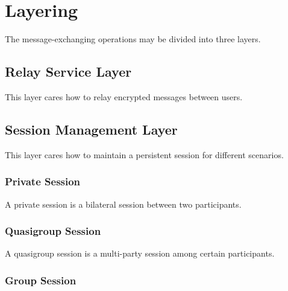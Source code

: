 \documentclass[a4paper,11pt]{article}
\begin{document}
\section{Layering}

The message-exchanging operations may be divided into three layers.


\subsection{Relay Service Layer}

This layer cares how to relay encrypted messages between users.


\subsection{Session Management Layer}

This layer cares how to maintain a persistent session for different scenarios.

\subsubsection{Private Session}

A private session is a bilateral session between two participants.

\subsubsection{Quasigroup Session}

A quasigroup session is a multi-party session among certain participants.

\subsubsection{Group Session}
\end{document}
